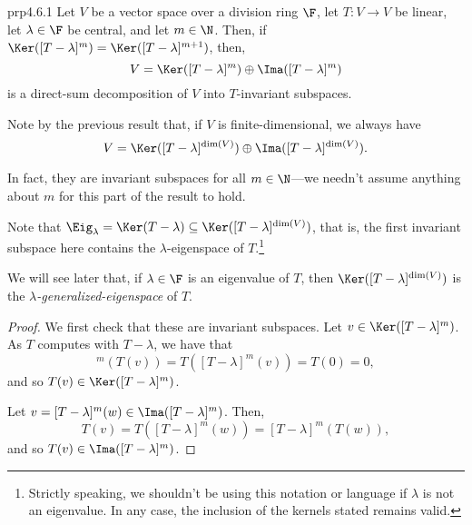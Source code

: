 \begin{prp}{}{prp4.6.1}
	Let $V$ be a vector space over a division ring $\F$, let $T\colon V\rightarrow V$ be linear, let $\lambda \in \F$ be central, and let $m\in \N$.  Then, if $\Ker ([T-\lambda ]^m)=\Ker ([T-\lambda ]^{m+1})$, then,
	\begin{equation}
		V=\Ker ([T-\lambda ]^m)\oplus \Ima ([T-\lambda ]^m)
	\end{equation}
	is a direct-sum decomposition of $V$ into $T$-invariant subspaces.
	\begin{rmk}
		Note by the previous result that, if $V$ is finite-dimensional, we always have
		\begin{equation}
			V=\Ker ([T-\lambda ]^{\dim (V)})\oplus \Ima ([T-\lambda ]^{\dim (V)}).
		\end{equation}
	\end{rmk}
	\begin{rmk}
		In fact, they are invariant subspaces for all $m\in \N$---we needn't assume anything about $m$ for this part of the result to hold.
	\end{rmk}
	\begin{rmk}
		Note that $\Eig _{\lambda}=\Ker (T-\lambda )\subseteq \Ker ([T-\lambda ]^{\dim (V)})$, that is, the first invariant subspace here contains the $\lambda$-eigenspace of $T$.\footnote{Strictly speaking, we shouldn't be using this notation or language if $\lambda$ is not an eigenvalue.  In any case, the inclusion of the kernels stated remains valid.}
	\end{rmk}
	\begin{rmk}
		We will see later that, if $\lambda \in \F$ is an eigenvalue of $T$, then $\Ker ([T-\lambda ]^{\dim (V)})$ is the \emph{$\lambda$-generalized-eigenspace} of $T$.
	\end{rmk}
	\begin{proof}
		We first check that these are invariant subspaces.  Let $v\in \Ker ([T-\lambda ]^{m})$.  As $T$ computes with $T-\lambda$, we have that
		\begin{equation}
			[T-\lambda ]^{m}(T(v))=T\left( [T-\lambda ]^{m}(v)\right) =T(0)=0,
		\end{equation}
		and so $T(v)\in \Ker ([T-\lambda ]^{m})$.
		
		Let $v=[T-\lambda ]^{m}(w)\in \Ima ([T-\lambda ]^{m})$.  Then,
		\begin{equation}
			T(v)=T\left( [T-\lambda ]^{m}(w)\right) =[T-\lambda ]^{m}\left( T(w)\right) ,
		\end{equation}
		and so $T(v)\in \Ima ([T-\lambda ]^{m})$.
		

\end{proof}
\end{prp}

